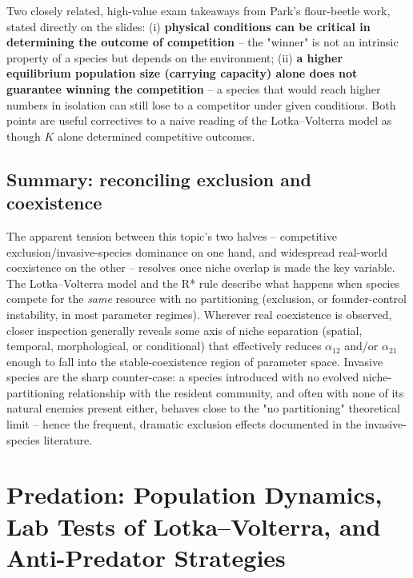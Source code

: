 \documentclass[11pt,a4paper]{article}
\begin{document}
\begin{exambox}
Two closely related, high-value exam takeaways from Park's flour-beetle work, stated directly on the slides: (i) \textbf{physical conditions can be critical in determining the outcome of competition} -- the "winner" is not an intrinsic property of a species but depends on the environment; (ii) \textbf{a higher equilibrium population size (carrying capacity) alone does not guarantee winning the competition} -- a species that would reach higher numbers in isolation can still lose to a competitor under given conditions. Both points are useful correctives to a naive reading of the Lotka--Volterra model as though $K$ alone determined competitive outcomes.
\end{exambox}

\subsection{Summary: reconciling exclusion and coexistence}
\begin{keybox}
The apparent tension between this topic's two halves -- competitive exclusion/invasive-species dominance on one hand, and widespread real-world coexistence on the other -- resolves once niche overlap is made the key variable. The Lotka--Volterra model and the R* rule describe what happens when species compete for the \emph{same} resource with no partitioning (exclusion, or founder-control instability, in most parameter regimes). Wherever real coexistence is observed, closer inspection generally reveals some axis of niche separation (spatial, temporal, morphological, or conditional) that effectively reduces $\alpha_{12}$ and/or $\alpha_{21}$ enough to fall into the stable-coexistence region of parameter space. Invasive species are the sharp counter-case: a species introduced with no evolved niche-partitioning relationship with the resident community, and often with none of its natural enemies present either, behaves close to the "no partitioning" theoretical limit -- hence the frequent, dramatic exclusion effects documented in the invasive-species literature.
\end{keybox}

\newpage

\section{Predation: Population Dynamics, Lab Tests of Lotka--Volterra, and Anti-Predator Strategies}
\end{document}
